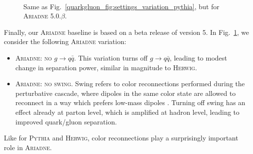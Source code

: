 \documentclass[11pt]{cernrep}
\begin{document}
\begin{figure}
\centering
{}
$\qquad$
\caption{Same as Fig.~\ref{quarkgluon_fig:settings_variation_pythia}, but for \textsc{Ariadne 5.0.$\beta$}.}
\label{quarkgluon_fig:settings_variation_ariadne}
\end{figure}

Finally, our \textsc{Ariadne} baseline is based on a beta release of version 5.  In Fig.~\ref{quarkgluon_fig:settings_variation_ariadne}, we consider the following \textsc{Ariadne} variation:
\begin{itemize}
\item \textsc{Ariadne:  no $g \to q\bar{q}$}.  This variation turns off $g \to q \bar{q}$, leading to modest change in separation power, similar in magnitude to \textsc{Herwig}.
\item \textsc{Ariadne: no swing}.  Swing refers to color reconnections performed during the perturbative cascade, where dipoles in the same color state are allowed to reconnect in a way which prefers low-mass dipoles  \cite{Flensburg:2011kk,Bierlich:2014xba}.  Turning off swing has an effect already at parton level, which is amplified at hadron level, leading to improved quark/gluon separation.
\end{itemize}
Like for \textsc{Pythia} and \textsc{Herwig}, color reconnections play a surprisingly important role in \textsc{Ariadne}.
\end{document}
